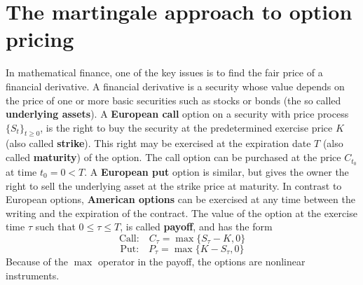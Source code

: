

\chapter{The martingale approach to option pricing}\label{Chapter2}
\minitoc%

\vspace{5em}


In mathematical finance, one of the key issues is to find the fair price of a financial derivative. 
A financial derivative is a security whose value depends on the price of one or more basic securities 
such as stocks or bonds (the so called \textbf{underlying assets}). 
A \textbf{European call} option on a security with price process $\{S_t\}_{t\geq0}$, is the right to
buy the security at the predetermined exercise price $K$ (also called \textbf{strike}). This right may be exercised at the expiration date $T$ (also called \textbf{maturity}) 
of the option.
The call option can be purchased at the price $C_{t_0}$ at time $t_0=0<T$.
A \textbf{European put} option is similar, but gives the owner the right to sell the underlying asset at the strike price at maturity. 
In contrast to European options, \textbf{American options} can be exercised at any time between the writing and the expiration of the contract.
The value of the option at the exercise time $\tau$ such that $0 \leq \tau \leq T$, is called \textbf{payoff}, and has the form
$$ \mbox{Call:} \quad C_{\tau} = \max \{ S_{\tau} - K, 0 \} $$
$$ \mbox{Put:} \quad P_{\tau} = \max \{ K - S_{\tau}, 0 \} $$
Because of the $\max$ operator in the payoff, the options are nonlinear instruments. 

